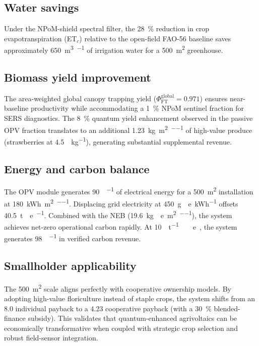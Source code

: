\documentclass[11pt,a4paper]{article}
\begin{document}
\subsection{Water savings}

Under the NPoM-shield spectral filter, the \qty{28}{\percent} reduction in crop evapotranspiration (ET$_c$) relative to the open-field FAO-56 baseline saves approximately \qty{650}{\m\cubed\per\yr} of irrigation water for a \qty{500}{\m\squared} greenhouse.

\subsection{Biomass yield improvement}

The area-weighted global canopy trapping yield ($\Phi_{\mathrm{FT}}^{\mathrm{global}} = 0.971$) ensures near-baseline productivity while accommodating a \qty{1}{\percent} NPoM sentinel fraction for SERS diagnostics. The \qty{8}{\percent} quantum yield enhancement observed in the passive OPV fraction translates to an additional \qty{1.23}{\kg\per\m\squared\per\yr} of high-value produce (strawberries at \qty{4.5}{\USD\per\kg}), generating substantial supplemental revenue.

\subsection{Energy and carbon balance}

The OPV module generates \qty{90}{\MWh\per\yr} of electrical energy for a \qty{500}{\m\squared} installation at \qty{180}{\kWh\per\m\squared\per\yr}. Displacing grid electricity at \qty{450}{\g{}e\per\kWh} offsets \qty{40.5}{\tonne{}e\per\yr}. Combined with the NEB (\qty{19.6}{\kg{}e\per\m\squared\per\yr}), the system achieves net-zero operational carbon rapidly. At \qty{10}{\USD\per\tonne\ e}~\cite{ICVCM2024}, the system generates \qty{98}{\USD\per\yr} in verified carbon revenue.

\subsection{Smallholder applicability}

The \qty{500}{\m\squared} scale aligns perfectly with cooperative ownership models. By adopting high-value floriculture instead of staple crops, the system shifts from an \qty{8.0}{\yr} individual payback to a \qty{4.23}{\yr} cooperative payback (with a \qty{30}{\percent} blended-finance subsidy). This validates that quantum-enhanced agrivoltaics can be economically transformative when coupled with strategic crop selection and robust field-sensor integration.
\end{document}
